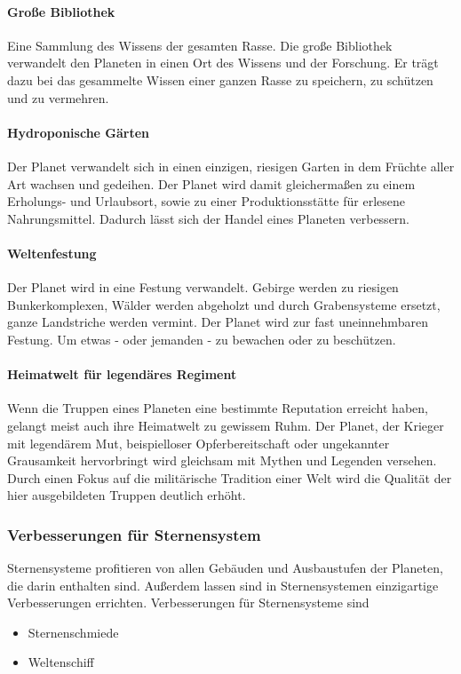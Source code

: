 \documentclass[11pt, a4paper]{article}
\begin{document}
\paragraph{Große Bibliothek}
Eine Sammlung des Wissens der gesamten Rasse. Die große Bibliothek verwandelt den Planeten in einen Ort des
Wissens und der Forschung. Er trägt dazu bei das gesammelte Wissen einer ganzen Rasse zu speichern, zu schützen
und zu vermehren.
%
\paragraph{Hydroponische Gärten}
Der Planet verwandelt sich in einen einzigen, riesigen Garten in dem Früchte aller Art wachsen und gedeihen.
Der Planet wird damit gleichermaßen zu einem Erholungs- und Urlaubsort, sowie zu einer Produktionsstätte für
erlesene Nahrungsmittel. Dadurch lässt sich der Handel eines Planeten verbessern.
%
\paragraph{Weltenfestung}
Der Planet wird in eine Festung verwandelt. Gebirge werden zu riesigen Bunkerkomplexen, Wälder werden abgeholzt
und durch Grabensysteme ersetzt, ganze Landstriche werden vermint. Der Planet wird zur fast uneinnehmbaren
Festung. Um etwas - oder jemanden - zu bewachen oder zu beschützen.
%
\paragraph{Heimatwelt für legendäres Regiment}
Wenn die Truppen eines Planeten eine bestimmte Reputation erreicht haben, gelangt meist auch ihre Heimatwelt
zu gewissem Ruhm. Der Planet, der Krieger mit legendärem Mut, beispielloser Opferbereitschaft oder ungekannter
Grausamkeit hervorbringt wird gleichsam mit Mythen und Legenden versehen. Durch einen Fokus auf die
militärische Tradition einer Welt wird die Qualität der hier ausgebildeten Truppen deutlich erhöht.
%
\subsubsection{Verbesserungen für Sternensystem}
Sternensysteme profitieren von allen Gebäuden und Ausbaustufen der Planeten, die darin enthalten sind.
Außerdem lassen sind in Sternensystemen einzigartige Verbesserungen errichten.
Verbesserungen für Sternensysteme sind
\begin{itemize}
    \item Sternenschmiede
    \item Weltenschiff
\end{itemize}
%
\end{document}
